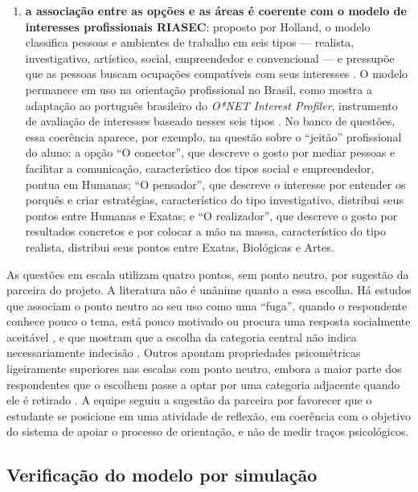 \begin{enumerate}
  \item \textbf{a associação entre as opções e as áreas é coerente com o modelo de interesses profissionais RIASEC}: proposto por Holland, o modelo classifica pessoas e ambientes de trabalho em seis tipos --- realista, investigativo, artístico, social, empreendedor e convencional --- e pressupõe que as pessoas buscam ocupações compatíveis com seus interesses \cite{brito2019}. O modelo permanece em uso na orientação profissional no Brasil, como mostra a adaptação ao português brasileiro do \textit{O*NET Interest Profiler}, instrumento de avaliação de interesses baseado nesses seis tipos \cite{teixeira2020}. No banco de questões, essa coerência aparece, por exemplo, na questão sobre o ``jeitão'' profissional do aluno: a opção ``O conector'', que descreve o gosto por mediar pessoas e facilitar a comunicação, característico dos tipos social e empreendedor, pontua em Humanas; ``O pensador'', que descreve o interesse por entender os porquês e criar estratégias, característico do tipo investigativo, distribui seus pontos entre Humanas e Exatas; e ``O realizador'', que descreve o gosto por resultados concretos e por colocar a mão na massa, característico do tipo realista, distribui seus pontos entre Exatas, Biológicas e Artes.
\end{enumerate}

As questões em escala utilizam quatro pontos, sem ponto neutro, por sugestão da parceira do projeto. A literatura não é unânime quanto a essa escolha. Há estudos que associam o ponto neutro ao seu uso como uma ``fuga'', quando o respondente conhece pouco o tema, está pouco motivado ou procura uma resposta socialmente aceitável \cite{chyung2017}, e que mostram que a escolha da categoria central não indica necessariamente indecisão \cite{wetzelhutter2020}. Outros apontam propriedades psicométricas ligeiramente superiores nas escalas com ponto neutro, embora a maior parte dos respondentes que o escolhem passe a optar por uma categoria adjacente quando ele é retirado \cite{kankaras2025}. A equipe seguiu a sugestão da parceira por favorecer que o estudante se posicione em uma atividade de reflexão, em coerência com o objetivo do sistema de apoiar o processo de orientação, e não de medir traços psicológicos.

\subsection{Verificação do modelo por simulação}

